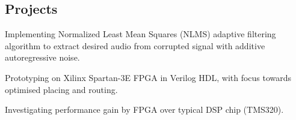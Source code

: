 \documentclass[]{deedy}
\begin{document}
\begin{minipage}[t]{0.72\textwidth}
\begin{flushleft}
\section{Projects}
%
\begin{tightemize}
\item Implementing Normalized Least Mean Squares (NLMS) adaptive filtering algorithm to extract desired audio from corrupted signal with additive autoregressive noise.
\item Prototyping on Xilinx Spartan-3E FPGA in Verilog HDL, with focus towards optimised placing and routing.
\item Investigating performance gain by FPGA over typical DSP chip (TMS320).
\end{tightemize}
\sectionsep
%
\begin{tightemize}
\item
\end{tightemize}
\sectionsep
%
\begin{tightemize}
\item
\end{tightemize}
\sectionsep

\end{flushleft}
\end{minipage}
\end{document}
